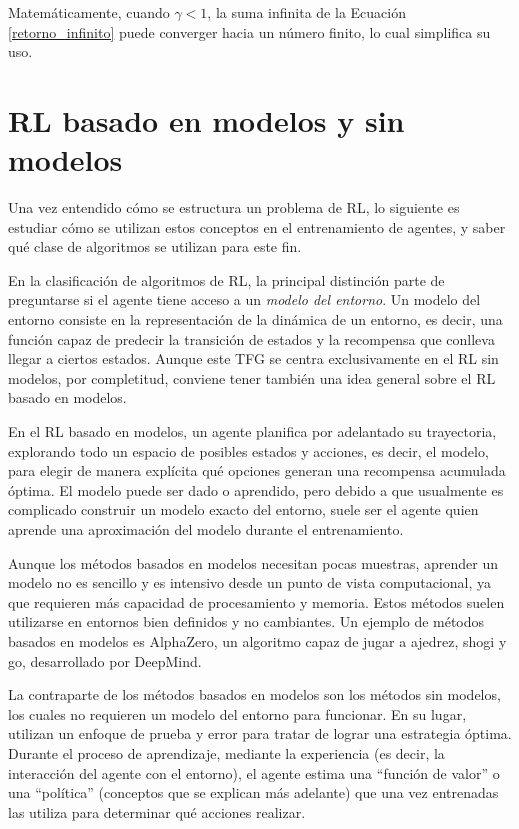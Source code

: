 Matemáticamente, cuando $\gamma < 1$, la suma infinita de la Ecuación \ref{retorno_infinito} puede converger hacia un número finito, lo cual simplifica su uso.

\section{RL basado en modelos y sin modelos}

Una vez entendido cómo se estructura un problema de RL, lo siguiente es estudiar cómo se utilizan estos conceptos en el entrenamiento de agentes, y saber qué clase de algoritmos se utilizan para este fin.

En la clasificación de algoritmos de RL, la principal distinción parte de preguntarse si el agente tiene acceso a un \emph{modelo del entorno}. Un modelo del entorno consiste en la representación de la dinámica de un entorno, es decir, una función capaz de predecir la transición de estados y la recompensa que conlleva llegar a ciertos estados. Aunque este TFG se centra exclusivamente en el RL sin modelos, por completitud, conviene tener también una idea general sobre el RL basado en modelos.

En el RL basado en modelos, un agente planifica por adelantado su trayectoria, explorando todo un espacio de posibles estados y acciones, es decir, el modelo, para elegir de manera explícita qué opciones generan una recompensa acumulada óptima. El modelo puede ser dado o aprendido, pero debido a que usualmente es complicado construir un modelo exacto del entorno, suele ser el agente quien aprende una aproximación del modelo durante el entrenamiento.

Aunque los métodos basados en modelos necesitan pocas muestras, aprender un modelo no es sencillo y es intensivo desde un punto de vista computacional, ya que requieren más capacidad de procesamiento y memoria. Estos métodos suelen utilizarse en entornos bien definidos y no cambiantes. Un ejemplo de métodos basados en modelos es AlphaZero, un algoritmo capaz de jugar a ajedrez, shogi y go, desarrollado por DeepMind.

La contraparte de los métodos basados en modelos son los métodos sin modelos, los cuales no requieren un modelo del entorno para funcionar. En su lugar, utilizan un enfoque de prueba y error para tratar de lograr una estrategia óptima. Durante el proceso de aprendizaje, mediante la experiencia (es decir, la interacción del agente con el entorno), el agente estima una ``función de valor'' o una ``política'' (conceptos que se explican más adelante) que una vez entrenadas las utiliza para determinar qué acciones realizar.

